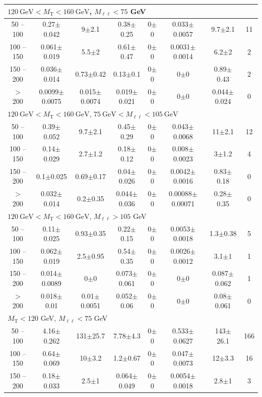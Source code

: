 \begin{table}
\begin{center}
\begin{tabular}{| c | c c c c c c c | }
\multicolumn{8}{l}{$120~\mathrm{GeV} < M_{\text{T}} < 160~\mathrm{GeV}$, $M_{\ell\ell} < 75$ GeV}\\\hline\hline
50 -- 100&0.27$\pm$0.042&9$\pm$2.1&0.38$\pm$0.25&0$\pm$0&0.033$\pm$0.0057&9.7$\pm$2.1&11\\
100 -- 150&0.061$\pm$0.019&5.5$\pm$2&0.61$\pm$0.47&0$\pm$0&0.0031$\pm$0.0014&6.2$\pm$2&2\\
150 -- 200&0.036$\pm$0.014&0.73$\pm$0.42&0.13$\pm$0.1&0$\pm$0&0$\pm$0&0.89$\pm$0.43&2\\
$>$ 200&0.0099$\pm$0.0075&0.015$\pm$0.0074&0.019$\pm$0.021&0$\pm$0&0$\pm$0&0.044$\pm$0.024&0\\
\hline\hline
\multicolumn{8}{l}{$120~\mathrm{GeV} < M_{\text{T}} < 160~\mathrm{GeV}$, $75~\mathrm{GeV} < M_{\ell\ell} < 105~\mathrm{GeV}$}\\\hline\hline
50 -- 100&0.39$\pm$0.052&9.7$\pm$2.1&0.45$\pm$0.29&0$\pm$0&0.043$\pm$0.0068&11$\pm$2.1&12\\
100 -- 150&0.14$\pm$0.029&2.7$\pm$1.2&0.18$\pm$0.12&0$\pm$0&0.008$\pm$0.0023&3$\pm$1.2&4\\
150 -- 200&0.1$\pm$0.025&0.69$\pm$0.17&0.04$\pm$0.026&0$\pm$0&0.0042$\pm$0.0016&0.83$\pm$0.18&0\\
$>$ 200&0.032$\pm$0.014&0.2$\pm$0.35&0.044$\pm$0.036&0$\pm$0&0.00088$\pm$0.00071&0.28$\pm$0.35&0\\
\hline\hline
\multicolumn{8}{l}{$120~\mathrm{GeV} < M_{\text{T}} < 160~\mathrm{GeV}$, $M_{\ell\ell} > 105$ GeV}\\\hline\hline
50 -- 100&0.11$\pm$0.025&0.93$\pm$0.35&0.22$\pm$0.15&0$\pm$0&0.0053$\pm$0.0018&1.3$\pm$0.38&5\\
100 -- 150&0.062$\pm$0.019&2.5$\pm$0.95&0.54$\pm$0.35&0$\pm$0&0.0026$\pm$0.0012&3.1$\pm$1&1\\
150 -- 200&0.014$\pm$0.0089&0$\pm$0&0.073$\pm$0.061&0$\pm$0&0$\pm$0&0.087$\pm$0.062&1\\
$>$ 200&0.018$\pm$0.01&0.01$\pm$0.0051&0.052$\pm$0.06&0$\pm$0&0$\pm$0&0.08$\pm$0.061&0\\
\hline\hline
\multicolumn{8}{l}{$M_{\text{T}} < 120$ GeV, $M_{\ell\ell} < 75$ GeV}\\\hline\hline
50 -- 100&4.16$\pm$0.262&131$\pm$25.7&7.78$\pm$4.3&0$\pm$0&0.533$\pm$0.0627&143$\pm$26.1&166\\
100 -- 150&0.64$\pm$0.069&10$\pm$3.2&1.2$\pm$0.67&0$\pm$0&0.047$\pm$0.0073&12$\pm$3.3&16\\
150 -- 200&0.18$\pm$0.033&2.5$\pm$1&0.064$\pm$0.049&0$\pm$0&0.0054$\pm$0.0018&2.8$\pm$1&3\\

\end{tabular}
\end{center}
\end{table}
